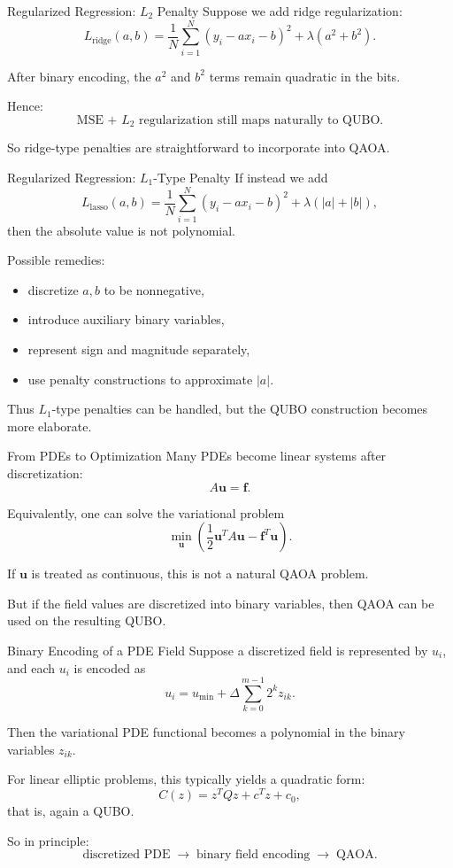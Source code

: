 \documentclass{beamer}
\begin{document}
\begin{frame}{Regularized Regression: \(L_2\) Penalty}
Suppose we add ridge regularization:
\[
L_{\mathrm{ridge}}(a,b)
=
\frac1N\sum_{i=1}^N (y_i-ax_i-b)^2 + \lambda(a^2+b^2).
\]

After binary encoding, the \(a^2\) and \(b^2\) terms remain quadratic in the bits.

Hence:
\[
\boxed{
\text{MSE + } L_2 \text{ regularization still maps naturally to QUBO.}
}
\]

So ridge-type penalties are straightforward to incorporate into QAOA.
\end{frame}

\begin{frame}{Regularized Regression: \(L_1\)-Type Penalty}
If instead we add
\[
L_{\mathrm{lasso}}(a,b)
=
\frac1N\sum_{i=1}^N (y_i-ax_i-b)^2 + \lambda(|a|+|b|),
\]
then the absolute value is not polynomial.

Possible remedies:
\begin{itemize}
\item discretize \(a,b\) to be nonnegative,
\item introduce auxiliary binary variables,
\item represent sign and magnitude separately,
\item use penalty constructions to approximate \(|a|\).
\end{itemize}

Thus \(L_1\)-type penalties can be handled, but the QUBO construction becomes more elaborate.
\end{frame}

\begin{frame}{From PDEs to Optimization}
Many PDEs become linear systems after discretization:
\[
A\mathbf{u}=\mathbf{f}.
\]

Equivalently, one can solve the variational problem
\[
\min_{\mathbf{u}}
\left(
\frac12 \mathbf{u}^T A \mathbf{u} - \mathbf{f}^T \mathbf{u}
\right).
\]

If \(\mathbf{u}\) is treated as continuous, this is not a natural QAOA problem.

But if the field values are discretized into binary variables, then QAOA can be used on the resulting QUBO.
\end{frame}

\begin{frame}{Binary Encoding of a PDE Field}
Suppose a discretized field is represented by \(u_i\), and each \(u_i\) is encoded as
\[
u_i = u_{\min} + \Delta \sum_{k=0}^{m-1} 2^k z_{ik}.
\]

Then the variational PDE functional becomes a polynomial in the binary variables \(z_{ik}\).

For linear elliptic problems, this typically yields a quadratic form:
\[
C(z)=z^T Q z + c^T z + c_0,
\]
that is, again a QUBO.

So in principle:
\[
\text{discretized PDE} \;\longrightarrow\; \text{binary field encoding} \;\longrightarrow\; \text{QAOA}.
\]
\end{frame}
\end{document}
